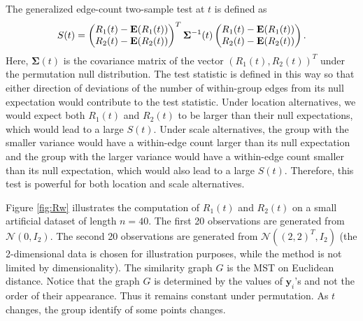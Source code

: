 \documentclass[arxiv, preprint]{imsart}
\numberwithin{equation}{section}
\theoremstyle{plain}
\begin{document}
The generalized edge-count two-sample test at $t$ is defined as 
\begin{equation}
\label{eq:S}
S(t) = \begin{pmatrix}
R_1(t) - \mathbf{E}(R_1(t)) \\
R_2(t) - \mathbf{E}(R_2(t)) \\
\end{pmatrix}^T \mathbf{\Sigma}^{-1}(t) \begin{pmatrix}
R_1(t) - \mathbf{E}(R_1(t)) \\
R_2(t) - \mathbf{E}(R_2(t)) \\
\end{pmatrix}. 
\end{equation}
Here, $\mathbf{\Sigma}(t)$ is the covariance matrix of the vector $(R_1(t), R_2(t))^T$ under the permutation null distribution. The test statistic is defined in this way so that either direction of deviations of the number of within-group edges from its null expectation would contribute to the test statistic. Under location alternatives, we would expect both $R_1(t)$ and $R_2(t)$ to be larger than their null expectations, which would lead to a large $S(t)$. Under scale alternatives, the group with the smaller variance would have a within-edge count larger than its null expectation and the group with the larger variance would have a within-edge count smaller than its null expectation, which would also lead to a large $S(t)$. Therefore, this test is powerful for both location and scale alternatives. 

Figure \ref{fig:Rw} illustrates the computation of $R_1(t)$ and $R_2(t)$ on a small artificial dataset of length $n=40$. The first 20 observations are generated from $\mathcal{N}(0,I_2)$. The second 20 observations are generated from $\mathcal{N}((2,2)^T,I_2)$ (the 2-dimensional data is chosen for illustration purposes, while the method is not limited by dimensionality). The similarity graph $G$ is the MST on Euclidean distance. Notice that the graph $G$ is determined by the values of $\mathbf{y}_i$'s and not the order of their appearance. Thus it remains constant under permutation. As $t$ changes, the group identify of some points changes. 
\end{document}
